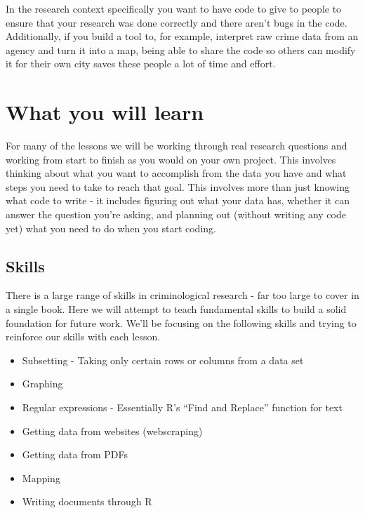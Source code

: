 \documentclass[
  12pt,
]{book}
\providecommand{\tightlist}{%
  \setlength{\itemsep}{0pt}\setlength{\parskip}{0pt}}
\begin{document}
In the research context specifically you want to have code to give to people to ensure that your research was done correctly and there aren't bugs in the code. Additionally, if you build a tool to, for example, interpret raw crime data from an agency and turn it into a map, being able to share the code so others can modify it for their own city saves these people a lot of time and effort.

\hypertarget{what-you-will-learn}{%
\section*{What you will learn}\label{what-you-will-learn}}

For many of the lessons we will be working through real research questions and working from start to finish as you would on your own project. This involves thinking about what you want to accomplish from the data you have and what steps you need to take to reach that goal. This involves more than just knowing what code to write - it includes figuring out what your data has, whether it can answer the question you're asking, and planning out (without writing any code yet) what you need to do when you start coding.

\hypertarget{skills}{%
\subsection*{Skills}\label{skills}}

There is a large range of skills in criminological research - far too large to cover in a single book. Here we will attempt to teach fundamental skills to build a solid foundation for future work. We'll be focusing on the following skills and trying to reinforce our skills with each lesson.

\begin{itemize}
\tightlist
\item
  Subsetting - Taking only certain rows or columns from a data set
\item
  Graphing
\item
  Regular expressions - Essentially R's ``Find and Replace'' function for text
\item
  Getting data from websites (webscraping)
\item
  Getting data from PDFs
\item
  Mapping
\item
  Writing documents through R
\end{itemize}
\end{document}
